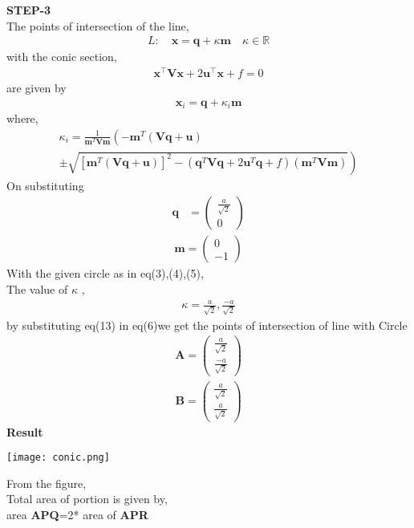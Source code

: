 \documentclass[10pt,a4paper]{report}
\newcommand{\myvec}[1]{\ensuremath{\begin{pmatrix}#1\end{pmatrix}}}
\let\vec\mathbf
\let\vec\mathbf
\providecommand{\brak}[1]{\ensuremath{\left(#1\right)}}
\providecommand{\lbrak}[1]{\ensuremath{\left(#1\right.}}
\providecommand{\rbrak}[1]{\ensuremath{\left.#1\right)}}
\providecommand{\sbrak}[1]{\ensuremath{{}\left[#1\right]}}
\begin{document}
\begin{multicols}{2}
\textbf{STEP-3}\vspace{2mm}\\
The points of intersection of the line, \\ 
\begin{align}
L: \quad \vec{x} = \vec{q} + \kappa \vec{m} \quad \kappa \in \mathbb{R}
\end{align}
with the conic section, \\ 
\begin{align}
	\vec{x}^{\top}\vec{V}\vec{x} + 2\vec{u}^{\top} \vec{x} + f = 0
\end{align}
are given by \\
\begin{align}
\vec{x}_i = \vec{q} + \kappa_i \vec{m}
\end{align}
where, \\
{\tiny
\begin{multline}
\kappa_i = \frac{1}
{
\vec{m}^T\vec{V}\vec{m}
}
\lbrak{-\vec{m}^T\brak{\vec{V}\vec{q}+\vec{u}}}
\\
\pm
\rbrak{\sqrt{
\sbrak{
\vec{m}^T\brak{\vec{V}\vec{q}+\vec{u}}
}^2
-
\brak
{
\vec{q}^T\vec{V}\vec{q} + 2\vec{u}^T\vec{q} +f
}
\brak{\vec{m}^T\vec{V}\vec{m}}
}
}
\end{multline}
}
On substituting\\
\begin{align}
\vec{q} &= \myvec{
\frac{a}{\sqrt{2}}\\
0
} 
\end{align}
\begin{align}
\vec{m} = \myvec{ 0 \\ -1 }
\end{align}
With the given circle  as in eq(3),(4),(5),\\ 

The value of $\kappa$ ,\\
\begin{align}
    \kappa =\frac{a}{\sqrt{2}},\frac{-a}{\sqrt{2}}
\end{align}
by substituting eq(13) in eq(6)we get the
points of intersection of line with Circle \\
\begin{align}
    \vec{A}=\myvec{
\frac{a}{\sqrt{2}}\\
\frac{-a}{\sqrt{2}}
    }
\end{align}
\begin{align}
    \vec{B}=\myvec{
\frac{a}{\sqrt{2}}\\
\frac{a}{\sqrt{2}}
    }
\end{align}
\textbf{Result}
\begin{center}
 \texttt{[image: conic.png]}    
 \end{center}\vspace{1mm}
 From the figure,\\ \vspace{1mm}
Total area of portion is given by, \\ \vspace{1mm}
area\textbf{ APQ}=2* area of \textbf{APR}


\end{multicols}
\end{document}
